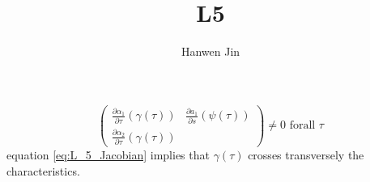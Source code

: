 \documentclass[a4paper]{article}
\title{L5}
\author{Hanwen Jin}
\theoremstyle{definition}
\begin{document}
	\maketitle
	\begin{equation}\label{eq:L_5_Jacobian}
		\begin{pmatrix} \frac{\partial \alpha_1}{\partial \tau} \left( \gamma\left( \tau \right)  \right)&\frac{\partial a_1}{\partial s} \left( \psi\left( \tau \right)  \right) \\\frac{\partial \alpha_2}{\partial \tau} \left( \gamma\left( \tau \right)  \right)   \end{pmatrix} \neq 0 \text{ forall $\tau$}
	\end{equation} 
	equation \ref{eq:L_5_Jacobian} implies that $\gamma\left( \tau \right) $ crosses transversely the characteristics. 
\end{document}
